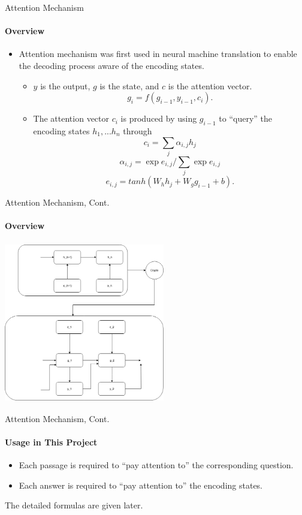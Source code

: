 \documentclass{beamer}
\begin{document}
\begin{frame}{Attention Mechanism}\framesubtitle{Overview}
    \begin{itemize}
        \item Attention mechanism was first used in neural machine translation to enable the decoding process aware of the encoding states.
        \begin{itemize}
            \item $y$ is the output, $g$ is the state, and $c$ is the attention vector. $$g_i =f(g_{i-1},y_{i-1},c_i).$$
            \item The attention vector $c_i$ is produced by using $g_{i-1}$ to ``query'' the encoding states $h_1, ... h_n$ through
        $$c_i = \sum _j {\alpha _{i,j} h_j}$$
        $$\alpha _{i,j} = \exp{e_{i,j}} / \sum _j {\exp{e_{i,j}}}$$
        $$e_{i,j} = tanh(W_h h_j + W_g g_{i-1} + b).$$
        \end{itemize}
    \end{itemize}
\end{frame}

\begin{frame}{Attention Mechanism, Cont.}\framesubtitle{Overview}
    \begin{center}
        \includegraphics[width=7cm, height=7cm]{figures/attention}
    \end{center}


\end{frame}


\begin{frame}{Attention Mechanism, Cont.}\framesubtitle{Usage in This Project}
    \begin{itemize}
        \item Each passage is required to ``pay attention to'' the corresponding question.
        \item Each answer is required to ``pay attention to'' the encoding states.
    \end{itemize}
The detailed formulas are given later.
\end{frame}
\end{document}
